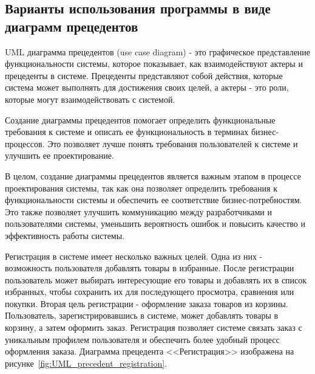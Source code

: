 \subsection*{Варианты использования программы в виде диаграмм прецедентов}

UML диаграмма прецедентов (use case diagram) - это графическое представление функциональности системы, которое показывает,
как взаимодействуют актеры и прецеденты в системе.
Прецеденты представляют собой действия, которые система может выполнять для достижения своих целей,
а актеры - это роли, которые могут взаимодействовать с системой.

Создание диаграммы прецедентов помогает определить функциональные требования к системе и описать ее функциональность в терминах бизнес-процессов.
Это позволяет лучше понять требования пользователей к системе и улучшить ее проектирование.


В целом, создание диаграммы прецедентов является важным этапом в процессе проектирования системы,
так как она позволяет определить требования к функциональности системы и обеспечить ее соответствие бизнес-потребностям.
Это также позволяет улучшить коммуникацию между разработчиками и пользователями системы, уменьшить вероятность ошибок и повысить качество и эффективность работы системы.


Регистрация в системе имеет несколько важных целей.
Одна из них - возможность пользователя добавлять товары в избранные.
После регистрации пользователь может выбирать интересующие его товары и добавлять их в список избранных,
чтобы сохранить их для последующего просмотра, сравнения или покупки.
Вторая цель регистрации - оформление заказа товаров из корзины.
Пользователь, зарегистрировавшись в системе, может добавлять товары в корзину,
а затем оформить заказ.
Регистрация позволяет системе связать заказ с уникальным профилем пользователя
и обеспечить более удобный процесс оформления заказа.
Диаграмма прецедента <<Регистрация>> изображена на рисунке~\ref{fig:UML_precedent_registration}.

